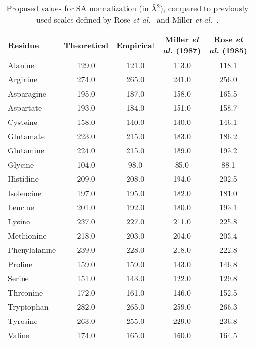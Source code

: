 \documentclass[11pt]{article}
\begin{document}
\begin{table}[H]
\caption{\label{tab:results}Proposed values for SA normalization (in \AA$^2$), compared to previously used scales defined by Rose \emph{et al.}~\cite{Rose1985} and Miller \emph{et al.}~\cite{Miller1987}.}

\begin{center}
\begin{tabular}{lcccc}
Residue & Theoretical & Empirical & Miller \emph{et al.} (1987) & Rose \emph{et al.} (1985) \\
\hline Alanine & 129.0 & 121.0 & 113.0 & 118.1 \\
Arginine        & 274.0 & 265.0 & 241.0 & 256.0 \\
Asparagine    & 195.0 & 187.0 & 158.0 & 165.5 \\
Aspartate      & 193.0 & 184.0 & 151.0 & 158.7 \\
Cysteine        & 158.0 & 140.0 & 140.0 & 146.1 \\
Glutamate     & 223.0 & 215.0 & 183.0 & 186.2 \\
Glutamine      & 224.0 & 215.0 & 189.0 & 193.2  \\
Glycine          & 104.0 & 98.0 & 85.0 & 88.1  \\
Histidine        & 209.0 & 208.0 & 194.0 & 202.5  \\
Isoleucine     & 197.0 & 195.0 & 182.0 & 181.0  \\
Leucine         & 201.0 & 192.0 & 180.0 & 193.1  \\
Lysine           & 237.0 & 227.0 & 211.0 & 225.8  \\
Methionine   & 218.0 & 203.0 & 204.0 & 203.4  \\
Phenylalanine  & 239.0 & 228.0 & 218.0 & 222.8  \\
Proline & 159.0 & 159.0& 143.0 & 146.8  \\
Serine          & 151.0 & 143.0 & 122.0 & 129.8  \\
Threonine          & 172.0 & 161.0 & 146.0 & 152.5  \\
Tryptophan          & 282.0 & 265.0 & 259.0 & 266.3  \\
Tyrosine          & 263.0 & 255.0 & 229.0 & 236.8 \\
Valine          & 174.0 & 165.0 & 160.0 & 164.5  \\
\hline
\end{tabular}
\end{center}
\end{table}
\end{document}
